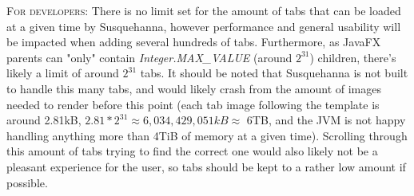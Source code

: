 \documentclass{report}
\begin{document}
	\begin{tcolorbox}[width=1\textwidth]
	\par
	\textsc{For developers:} There is no limit set for the amount of tabs that can be loaded at a given time by Susquehanna, however performance and general usability will be impacted when adding several hundreds of tabs. Furthermore, as JavaFX parents can "only" contain \emph{Integer.MAX\_VALUE} (around \(2^{31}\)) children, there's likely a limit of around \(2^{31}\) tabs. It should be noted that Susquehanna is not built to handle this many tabs, and would likely crash from the amount of images needed to render before this point (each tab image following the template is around 2.81kB, \(2.81 * 2^{31} \approx 6,034,429,051kB \approx\) 6TB, and the JVM is not happy handling anything more than 4TiB of memory at a given time). Scrolling through this amount of tabs trying to find the correct one would also likely not be a pleasant experience for the user, so tabs should be kept to a rather low amount if possible.
	\end{tcolorbox}
\end{document}
